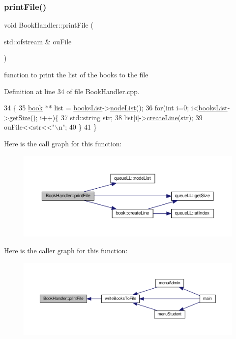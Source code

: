 \subsubsection{\texorpdfstring{print\+File()}{printFile()}}
{\footnotesize\ttfamily void Book\+Handler\+::print\+File (\begin{DoxyParamCaption}\item[{std\+::ofstream \&}]{ou\+File }\end{DoxyParamCaption})}

function to print the list of the books to the file 

Definition at line 34 of file Book\+Handler.\+cpp.


\begin{DoxyCode}
34                                                \{
35     \hyperlink{classbook}{book} ** list = \hyperlink{class_book_handler_a13a6c78422b3ad7acd5ebdb9555a0286}{booksList}->\hyperlink{classqueue_l_l_ae9a479b9463f51c5148dd80b68335d32}{nodeList}();
36     \textcolor{keywordflow}{for}(\textcolor{keywordtype}{int} i=0; i<\hyperlink{class_book_handler_a13a6c78422b3ad7acd5ebdb9555a0286}{booksList}->\hyperlink{classqueue_l_l_a8969feebcb563f0b489bc112422b9563}{getSize}(); i++)\{
37         std::string str;
38         list[i]->\hyperlink{classbook_aea835c54459ec0a4d29d42f2f6f7858d}{createLine}(str);
39         ouFile<<str<<\textcolor{stringliteral}{"\(\backslash\)n"};
40     \}
41 \}
\end{DoxyCode}
Here is the call graph for this function\+:
\nopagebreak
\begin{figure}[H]
\begin{center}
\leavevmode
\includegraphics[width=350pt]{class_book_handler_a6794f0f693ff3048df64a5b254c183af_cgraph}
\end{center}
\end{figure}
Here is the caller graph for this function\+:
\nopagebreak
\begin{figure}[H]
\begin{center}
\leavevmode
\includegraphics[width=350pt]{class_book_handler_a6794f0f693ff3048df64a5b254c183af_icgraph}
\end{center}
\end{figure}


